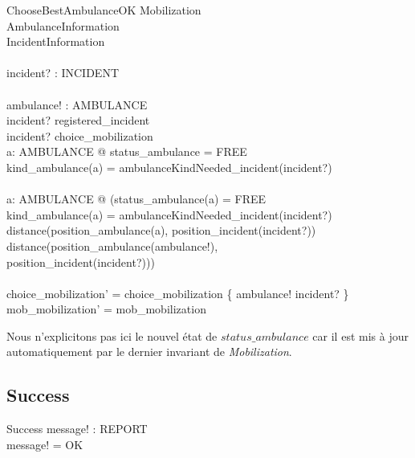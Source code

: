 \documentclass{report}
\begin{document}
\begin{schema}{ChooseBestAmbulanceOK}
	\Delta Mobilization 	\\
	\Xi AmbulanceInformation\\
	\Xi IncidentInformation	\\
	\newline				\\
	incident? : INCIDENT	\\
	\newline				\\
	ambulance! : AMBULANCE	\\
  \where
  	incident? \in registered\_incident \\
  	incident? \notin \ran choice\_mobilization \\
  	\exists a: AMBULANCE @ status\_ambulance = FREE \land \\
  	 kind\_ambulance(a) = ambulanceKindNeeded\_incident(incident?) \\
  	\newline \\
  	\forall a: AMBULANCE @ (status\_ambulance(a) = FREE \land \\
  	 kind\_ambulance(a) = ambulanceKindNeeded\_incident(incident?) \land \\
  	 distance(position\_ambulance(a), position\_incident(incident?)) \\
  	 \geq distance(position\_ambulance(ambulance!), \\
  	 position\_incident(incident?)))\\
  	\newline \\
  	choice\_mobilization' = choice\_mobilization \oplus \{ ambulance! \mapsto incident? \} \\
  	mob\_mobilization' = mob\_mobilization
\end{schema}

	Nous n'explicitons pas ici le nouvel état de $status\_ambulance$ car il
	est mis à jour automatiquement par le dernier invariant de
	\textit{Mobilization}.

\subsection{Success}

\begin{schema}{Success}
	message! : REPORT	\\
  \where				
	message! = OK		\\
\end{schema}
\end{document}
